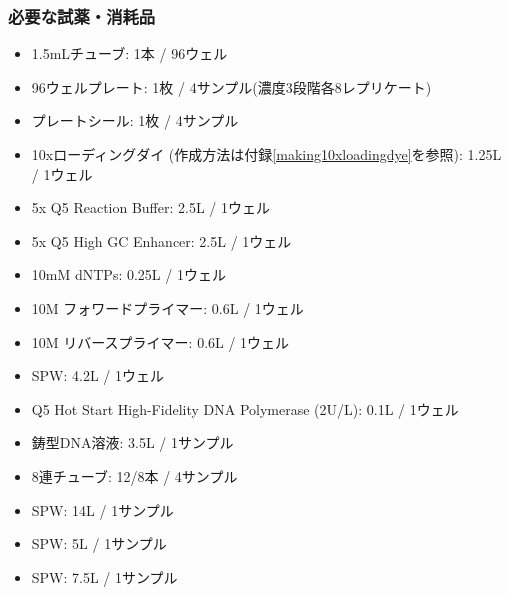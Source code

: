 \documentclass[titlepage,10pt,a4paper,uplatex]{jsbook}
\begin{document}
\subsubsection{必要な試薬・消耗品}
\begin{itemize}
\item 1.5mLチューブ: 1本 / 96ウェル
\item 96ウェルプレート: 1枚 / 4サンプル(濃度3段階各8レプリケート)
\item プレートシール: 1枚 / 4サンプル
\item 10xローディングダイ (作成方法は付録\ref{making10xloadingdye}を参照): 1.25{\textmu}L / 1ウェル
\item 5x Q5 Reaction Buffer: 2.5{\textmu}L / 1ウェル
\item 5x Q5 High GC Enhancer: 2.5{\textmu}L / 1ウェル
\item 10mM dNTPs: 0.25{\textmu}L / 1ウェル
\item 10{\textmu}M フォワードプライマー: 0.6{\textmu}L / 1ウェル
\item 10{\textmu}M リバースプライマー: 0.6{\textmu}L / 1ウェル
\item SPW: 4.2{\textmu}L / 1ウェル
\item Q5 Hot Start High-Fidelity DNA Polymerase (2U/{\textmu}L): 0.1{\textmu}L / 1ウェル
\item 鋳型DNA溶液: 3.5{\textmu}L / 1サンプル
\item 8連チューブ: 12/8本 / 4サンプル
\item SPW: 14{\textmu}L / 1サンプル
\item SPW: 5{\textmu}L / 1サンプル
\item SPW: 7.5{\textmu}L / 1サンプル
\end{itemize}
\end{document}
